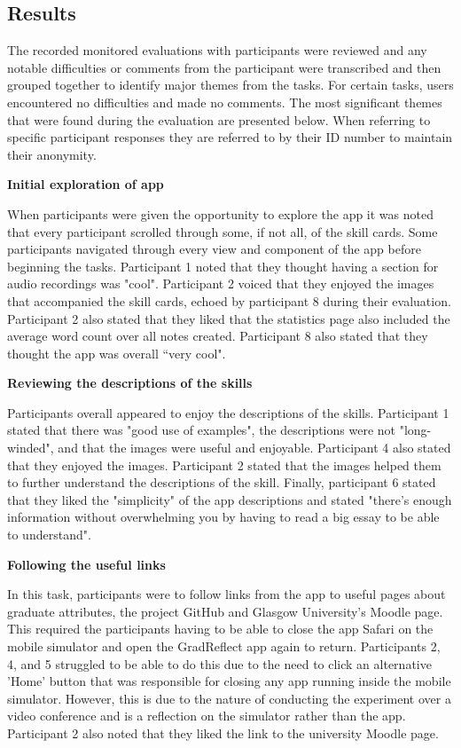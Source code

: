 \documentclass{l4proj}
\begin{document}
\subsection{Results}

The recorded monitored evaluations with participants were reviewed and any notable difficulties or comments from the participant were transcribed and then grouped together to identify major themes from the tasks. For certain tasks, users encountered no difficulties and made no comments. The most significant themes that were found during the evaluation are presented below. When referring to specific participant responses they are referred to by their ID number to maintain their anonymity.

\textbf{Initial exploration of app}

When participants were given the opportunity to explore the app it was noted that every participant scrolled through some, if not all, of the skill cards. Some participants navigated through every view and component of the app before beginning the tasks. Participant 1 noted that they thought having a section for audio recordings was "cool". Participant 2 voiced that they enjoyed the images that accompanied the skill cards, echoed by participant 8 during their evaluation. Participant 2 also stated that they liked that the statistics page also included the average word count over all notes created. Participant 8 also stated that they thought the app was overall “very cool".

\textbf{Reviewing the descriptions of the skills}

Participants overall appeared to enjoy the descriptions of the skills. Participant 1 stated that there was "good use of examples", the descriptions were not "long-winded", and that the images were useful and enjoyable. Participant 4 also stated that they enjoyed the images. Participant 2 stated that the images helped them to further understand the descriptions of the skill. Finally, participant 6 stated that they liked the "simplicity" of the app descriptions and stated "there's enough information without overwhelming you by having to read a big essay to be able to understand".


\textbf{Following the useful links}

In this task, participants were to follow links from the app to useful pages about graduate attributes, the project GitHub and Glasgow University's Moodle page. This required the participants having to be able to close the app Safari on the mobile simulator and open the GradReflect app again to return. Participants 2, 4, and 5 struggled to be able to do this due to the need to click an alternative 'Home' button that was responsible for closing any app running inside the mobile simulator. However, this is due to the nature of conducting the experiment over a video conference and is a reflection on the simulator rather than the app. Participant 2 also noted that they liked the link to the university Moodle page.
\end{document}
